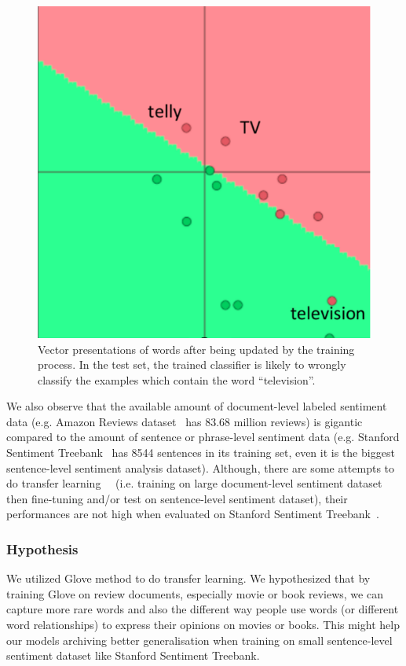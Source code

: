 \begin{figure}[H]
    \centering
    \includegraphics[scale=0.31]{figure/vec-after-update}
    \caption[Word embeddings updating causing over-fitting 2]{Vector presentations of words after being updated by the training process.
    In the test set, the trained classifier is likely to wrongly classify the examples which contain the word ``television''.}
    \label{fig:updating-word-bad-2}
\end{figure}

We also observe that the available amount of document-level labeled sentiment data (e.g. Amazon Reviews dataset~\cite{amazon-reviews} has 83.68 million reviews) is gigantic compared to the amount of sentence or phrase-level sentiment data (e.g. Stanford Sentiment Treebank~\cite{socher2013recursive} has 8544 sentences in its training set, even it is the biggest sentence-level sentiment analysis dataset).
Although, there are some attempts to do transfer learning~\cite{group-instance}~\cite{re-embedding} (i.e. training on large document-level sentiment dataset then fine-tuning and/or test on sentence-level sentiment dataset), their performances are not high when evaluated on Stanford Sentiment Treebank~\cite{group-instance}.

\subsubsection{Hypothesis}
We utilized Glove method to do transfer learning.
We hypothesized that by training Glove on review documents, especially movie or book reviews, we can capture more rare words and also the different way people use words (or different word relationships) to express their opinions on movies or books.
This might help our models archiving better generalisation when training on small sentence-level sentiment dataset like Stanford Sentiment Treebank.

